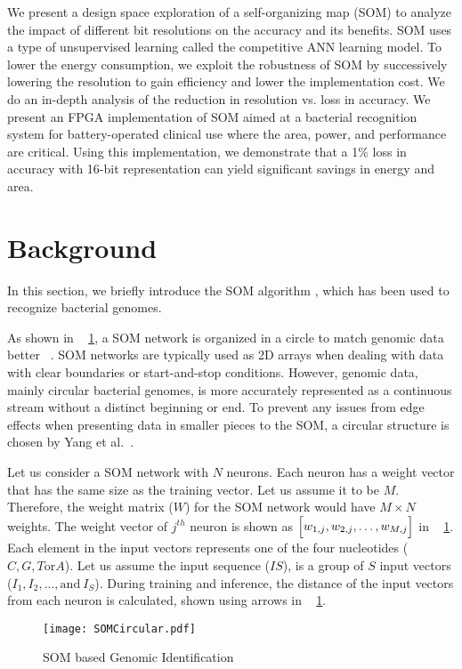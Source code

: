 We present a design space exploration of a self-organizing map (SOM) to analyze the impact of different bit resolutions on the accuracy and its benefits. SOM uses a type of unsupervised learning called the competitive ANN learning model. To lower the energy consumption, we exploit the robustness of SOM by successively lowering the resolution to gain efficiency and lower the implementation cost. We do an in-depth analysis of the reduction in resolution vs. loss in accuracy. We present an FPGA implementation of SOM aimed at a bacterial recognition system for battery-operated clinical use where the area, power, and performance are critical. Using this implementation, we demonstrate that a 1\% loss in accuracy with 16-bit representation can yield significant savings in energy and area.
\section{Background}
In this section, we briefly introduce the SOM algorithm \cite{Yang2018RiBoSOM}, which has been used to recognize bacterial genomes.

As shown in \figurename{~ \ref{fig:algorithm}}, a SOM network is organized in a circle to match genomic data better ~\cite{Yang2018RiBoSOM}. SOM networks are typically used as 2D arrays when dealing with data with clear boundaries or start-and-stop conditions. However, genomic data, mainly circular bacterial genomes, is more accurately represented as a continuous stream without a distinct beginning or end. To prevent any issues from edge effects when presenting data in smaller pieces to the SOM, a circular structure is chosen by Yang et al.~\cite{Yang2018RiBoSOM}. 

Let us consider a SOM network with $N$ neurons. Each neuron has a weight vector that has the same size as the training vector. Let us assume it to be $M$. Therefore, the weight matrix ($W$) for the SOM network would have $M{\times}N$ weights. The weight vector of $j^{th}$ neuron is shown as $\Bigl[ w_{1,j},w_{2,j},\ldots,w_{M,j}\Bigr]$ in \figurename{~ \ref{fig:algorithm}}. Each element in the input vectors represents one of the four nucleotides ($C,G,T \text{or} A$). Let us assume the input sequence ($IS$), is a group of $S$ input vectors ($I_1, I_2,...,\text{and}~I_S$). During training and inference, the distance of the input vectors from each neuron is calculated, shown using arrows in \figurename{~ \ref{fig:algorithm}}.
\begin{figure}[htb]
	\centerline{\texttt{[image: SOMCircular.pdf]}}
	\caption{SOM based Genomic Identification}
	\label{fig:algorithm}
\end{figure}

